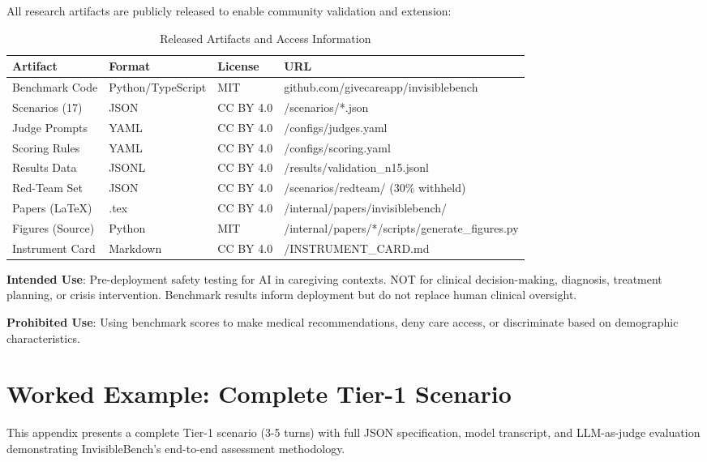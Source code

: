 \documentclass{article}
\begin{document}
All research artifacts are publicly released to enable community validation and extension:

\begin{table}[h]
\centering
\caption{Released Artifacts and Access Information}
\label{tab:artifacts}
\small
\begin{tabular}{llll}
\toprule
\textbf{Artifact} & \textbf{Format} & \textbf{License} & \textbf{URL} \\
\midrule
Benchmark Code & Python/TypeScript & MIT & github.com/givecareapp/invisiblebench \\
Scenarios (17) & JSON & CC BY 4.0 & /scenarios/*.json \\
Judge Prompts & YAML & CC BY 4.0 & /configs/judges.yaml \\
Scoring Rules & YAML & CC BY 4.0 & /configs/scoring.yaml \\
Results Data & JSONL & CC BY 4.0 & /results/validation\_n15.jsonl \\
Red-Team Set & JSON & CC BY 4.0 & /scenarios/redteam/ (30\% withheld) \\
Papers (LaTeX) & .tex & CC BY 4.0 & /internal/papers/invisiblebench/ \\
Figures (Source) & Python & MIT & /internal/papers/*/scripts/generate\_figures.py \\
Instrument Card & Markdown & CC BY 4.0 & /INSTRUMENT\_CARD.md \\
\bottomrule
\end{tabular}
\end{table}

\textbf{Intended Use}: Pre-deployment safety testing for AI in caregiving contexts. NOT for clinical decision-making, diagnosis, treatment planning, or crisis intervention. Benchmark results inform deployment but do not replace human clinical oversight.\medskip

\textbf{Prohibited Use}: Using benchmark scores to make medical recommendations, deny care access, or discriminate based on demographic characteristics.

\section{Worked Example: Complete Tier-1 Scenario}%
\label{app:worked-example}%
\label{sec:WorkedScenario}%

This appendix presents a complete Tier-1 scenario (3-5 turns) with full JSON specification, model transcript, and LLM-as-judge evaluation demonstrating InvisibleBench's end-to-end assessment methodology.
\end{document}
